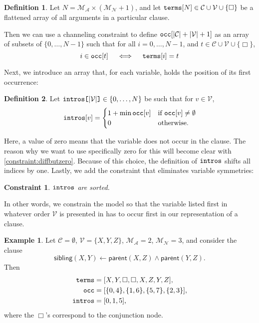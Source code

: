 \documentclass[letterpaper]{article}
\newtheorem{constraint}{Constraint}
\theoremstyle{definition}
\newtheorem{definition}{Definition}
\newtheorem{example}{Example}
\newcommand{\variable}[1]{\texttt{\textup{#1}}}
\newcommand{\arrayd}[3]{\variable{{#1}[}{#2}\variable{]} \in {#3}}
\newcommand{\variables}{\mathcal{V}}
\newcommand{\constants}{\mathcal{C}}
\newcommand{\maxArity}{\mathcal{M}_{\mathcal{A}}}
\newcommand{\maxNumNodes}{\mathcal{M}_{\mathcal{N}}}
\begin{document}
\begin{definition}
  Let $N = \maxArity{} \times (\maxNumNodes{} + 1)$, and let
  $\variable{terms}[N] \in \constants{} \cup \variables{} \cup \{ \Box
  \}$ be a flattened array of all arguments in a particular clause.

  Then we can use a channeling constraint to define
  $\variable{occ}[|\constants{}| + |\variables{}| + 1]$ as an array of subsets
  of $\{ 0, \dots, N-1 \}$ such that for all $i = 0, \dots, N - 1$, and $t \in
  \constants{} \cup \variables{} \cup \{ \Box \}$,
  \[
    i \in \variable{occ}[t] \quad \iff \quad
    \variable{terms}[i] = t
  \]
\end{definition}

Next, we introduce an array that, for each variable, holds the position of its
first occurrence:

\begin{definition}
  Let $\arrayd{intros}{|\variables{}|}{\{ 0, \dots, N \}}$ be such that
  for $v \in \variables{}$,
  \[
    \variable{intros}[v] = \begin{cases}
      1 + \min \variable{occ}[v] & \text{if }
      \variable{occ}[v] \ne \emptyset\\
      0 & \text{otherwise.}
    \end{cases}
  \]
\end{definition}

Here, a value of zero means that the variable does not occur in the clause. The
reason why we want to use specifically zero for this will become clear with
\cref{constraint:diffbutzero}. Because of this choice, the definition of
$\variable{intros}$ shifts all indices by one. Lastly, we add the constraint
that eliminates variable symmetries:

\begin{constraint}
  $\variable{intros}$ are sorted.
\end{constraint}

In other words, we constrain the model so that the variable listed first in
whatever order $\variables{}$ is presented in has to occur first in our
representation of a clause.

\begin{example} \label{example:sibling}
  Let $\constants{} = \emptyset$, $\variables{} = \{ X, Y, Z \}$, $\maxArity{} =
  2$, $\maxNumNodes{} = 3$, and consider the clause
  \[
    \mathsf{sibling}(X, Y) \gets \mathsf{parent}(X, Z) \land
    \mathsf{parent}(Y, Z).
  \]
  Then
  \begin{align*}
    \variable{terms} &= [X, Y, \Box, \Box, X, Z, Y, Z], \\
    \variable{occ} &= [\{ 0, 4 \}, \{ 1, 6 \}, \{ 5, 7 \}, \{ 2, 3 \}], \\
    \variable{intros} &= [0, 1, 5],
  \end{align*}
  where the $\Box$'s correspond to the conjunction node.
\end{example}
\end{document}
